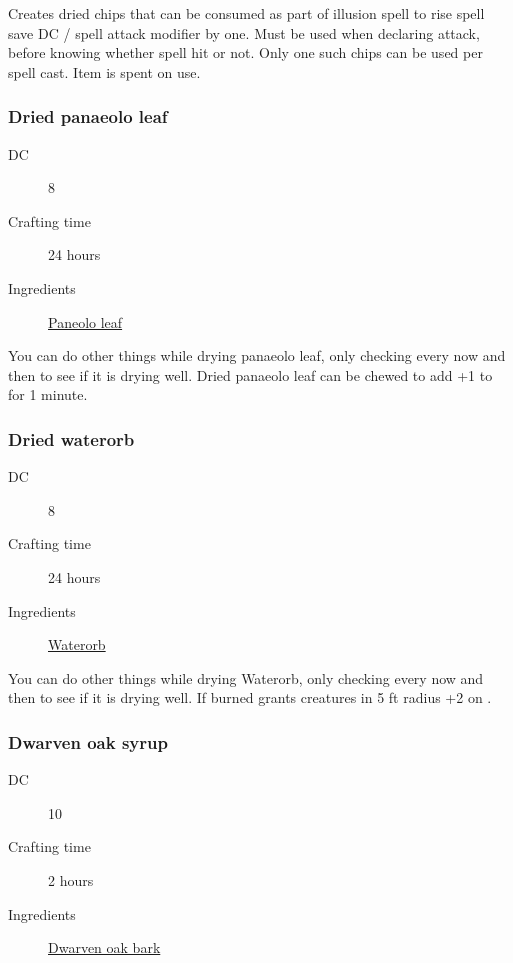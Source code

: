 Creates dried chips that can be consumed as part of illusion spell to rise spell save DC / spell attack modifier by one. Must be used when declaring attack, before knowing whether spell hit or not. Only one such chips can be used per spell cast. Item is spent on use.

\subsubsection{Dried panaeolo leaf}
\label{Dried panaeolo leaf}

\begin{description}
\item [DC] 8 \survival
\item [Crafting time] 24 hours
\item [Ingredients] \hyperref[Panaeolo]{Paneolo leaf}
\end{description}

You can do other things while drying panaeolo leaf, only checking every now and then to 
see if it is drying well. Dried panaeolo leaf can be chewed to add +1 to \arcana for 1 minute.

\subsubsection{Dried waterorb}
\label{Dried waterorb}

\begin{description}
\item [DC] 8 \survival
\item [Crafting time] 24 hours
\item [Ingredients] \hyperref[Waterorb]{Waterorb}
\end{description}

You can do other things while drying Waterorb, only checking every now and then to see if it is drying well.
If burned grants creatures in 5 ft radius +2 on \religion.

\subsubsection{Dwarven oak syrup}
\label{Dwarven oak syrup}

\begin{description}
\item [DC] 10 \nature
\item [Crafting time] 2 hours
\item [Ingredients] \hyperref[Dwarven Oak]{Dwarven oak bark}
\end{description}

